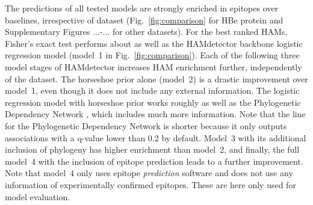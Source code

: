 \documentclass{bioinfo}
\begin{document}


The predictions of all tested models are strongly enriched in epitopes over baselines, irrespective of dataset (Fig.~\ref{fig:comparison} for HBe protein and Supplementary Figures ...-... for other datasets). For the best ranked HAMs, Fisher's exact test performs about as well as the HAMdetector backbone logistic regression model (model~1 in Fig.~\ref{fig:comparison}). Each of the following three model stages of HAMdetector increases HAM enrichment further, independently of the dataset.
The horseshoe prior alone (model~2) is a drastic improvement over model~1, even though it does not include any external information. The logistic regression model with horseshoe prior works roughly as well as the Phylogenetic Dependency Network \cite{Carlson2008}, which includes much more information. Note that the line for the Phylogenetic Dependency Network is shorter because it only outputs associations with a q-value lower than 0.2 by default. Model~3 with its additional inclusion of phylogeny has higher enrichment than model~2, and finally, the full model~4 with the inclusion of epitope prediction leads to a further improvement. Note that model~4 only uses epitope \textit{prediction} software and does not use any information of experimentally confirmed epitopes. These are here only used for model evaluation.
\end{document}
